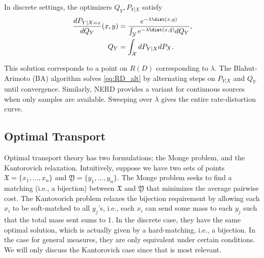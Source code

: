 \documentclass[11pt]{article}
\begin{document}
    

	
    In discrete settings,  the optimizers $Q_Y, P_{Y|X}$ satisfy
    \begin{align}
        \frac{dP_{Y|X=x}}{dQ_Y}(x,y) &= \frac{e^{-\lambda \dist(x,y)}}{\int_{\mathcal{Y}} e^{-\lambda \dist(x,\tilde{y})}dQ_Y} , \label{eq:BA_1} \\
        Q_Y &= \int_{\mathcal{X}}  dP_{Y|X} dP_X. 
        \label{eq:BA_2}
    \end{align}

    This solution corresponds to a point on $R(D)$ corresponding to $\lambda$. The Blahut-Arimoto (BA) algorithm \cite{blahut, arimoto} solves \eqref{eq:RD_alt} by alternating steps on $P_{Y|X}$ and $Q_Y$ until convergence. Similarly, NERD \cite{NERD} provides a variant for continuous sources when only samples are available. Sweeping over $\lambda$ gives the entire rate-distortion curve.
    

    \subsection{Optimal Transport}
    Optimal transport theory has two formulations; the Monge problem, and the Kantorovich relaxation. Intuitively, suppose we have two sets of points $\mathfrak{X} = \{x_1,\dots,x_n\}$ and $\mathfrak{Y} = \{y_1,\dots,y_n\}$. The Monge problem seeks to find a matching (i.e., a bijection) between $\mathfrak{X}$ and $\mathfrak{Y}$ that minimizes the average pairwise cost. The Kantovorich problem relaxes the bijection requirement by allowing each $x_i$ to be soft-matched to all $y_j$'s, i.e., each $x_i$ can send some mass to each $y_j$ such that the total mass sent sums to 1. In the discrete case, they have the same optimal solution, which is actually given by a hard-matching, i.e., a bijection. In the case for general measures, they are only equivalent under certain conditions. We will only discuss the Kantorovich case since that is most relevant.
\end{document}
